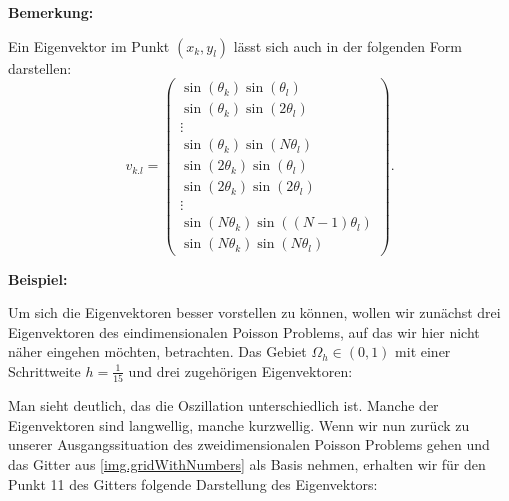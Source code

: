 \textbf{Bemerkung:}

Ein Eigenvektor im Punkt $(x_{k},y_{l})$ lässt sich auch in der folgenden Form darstellen:
\begin{equation}
v_{k.l} = 
\begin{pmatrix}
\sin(\theta_{k})\sin(\theta_{l})\\
\sin(\theta_{k})\sin(2 \theta_{l})\\
\vdots \\
\sin(\theta_{k})\sin(N \theta_{l})\\
\sin(2 \theta_{k})\sin(\theta_{l})\\
\sin(2 \theta_{k})\sin(2 \theta_{l})\\
\vdots\\
\sin(N \theta_{k})\sin((N-1) \theta_{l})\\
\sin(N \theta_{k})\sin(N \theta_{l})
\end{pmatrix}.
\end{equation}

\textbf{Beispiel:}

Um sich die Eigenvektoren besser vorstellen zu können, wollen wir zunächst drei Eigenvektoren des eindimensionalen Poisson Problems, auf das wir hier nicht näher eingehen möchten, betrachten. Das Gebiet $\Omega_{h} \in (0,1)$ mit einer Schrittweite $h = \frac{1}{15}$ und drei zugehörigen Eigenvektoren:

\label{img.1D Langwelle}

Man sieht deutlich, das die Oszillation unterschiedlich ist. Manche der Eigenvektoren sind langwellig, manche kurzwellig. Wenn wir nun zurück zu unserer Ausgangssituation des zweidimensionalen Poisson Problems gehen und das Gitter aus \autoref{img.gridWithNumbers} als Basis nehmen, erhalten wir für den Punkt 11 des Gitters folgende Darstellung des Eigenvektors:

\label{img.Jacobi1}

